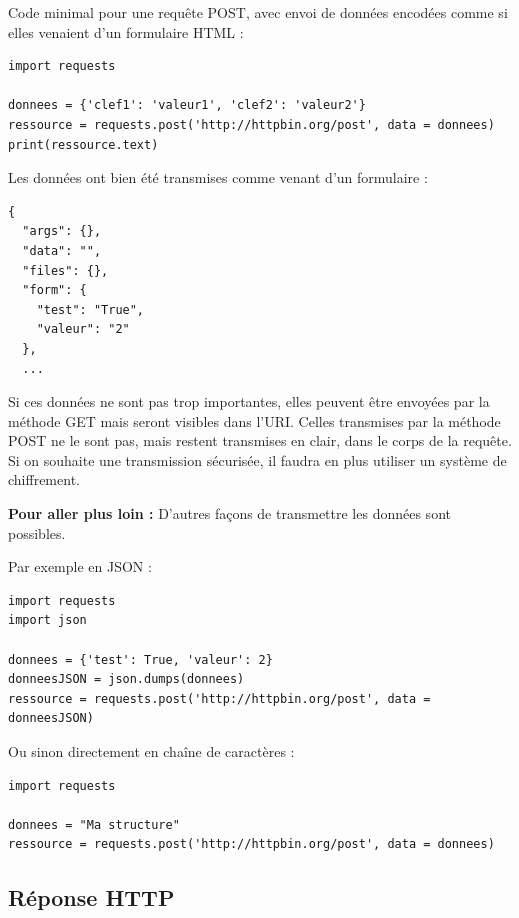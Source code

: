 \medskip

Code minimal pour une requête POST, avec envoi de données encodées comme si elles venaient d'un formulaire HTML :

\vspace{-2ex}
\begin{verbatim}
import requests

donnees = {'clef1': 'valeur1', 'clef2': 'valeur2'}
ressource = requests.post('http://httpbin.org/post', data = donnees)
print(ressource.text)
\end{verbatim}

Les données ont bien été transmises comme venant d'un formulaire :


\vspace{-2ex}
\begin{verbatim}
{
  "args": {}, 
  "data": "", 
  "files": {}, 
  "form": {
    "test": "True", 
    "valeur": "2"
  }, 
  ...
\end{verbatim}

Si ces données ne sont pas trop importantes, elles peuvent être envoyées par la méthode GET mais seront visibles dans l'URI. Celles transmises par la méthode POST ne le sont pas, mais restent transmises en clair, dans le corps de la requête. Si on souhaite une transmission sécurisée, il faudra en plus utiliser un système de chiffrement.

\medskip

{\bfseries Pour aller plus loin :} D'autres façons de transmettre les données sont possibles.

Par exemple en JSON :

\vspace{-2ex}
\begin{verbatim}
import requests
import json

donnees = {'test': True, 'valeur': 2}
donneesJSON = json.dumps(donnees)
ressource = requests.post('http://httpbin.org/post', data = donneesJSON)
\end{verbatim}

Ou sinon directement en chaîne de caractères :

\vspace{-2ex}
\begin{verbatim}
import requests

donnees = "Ma structure"
ressource = requests.post('http://httpbin.org/post', data = donnees)
\end{verbatim}



\subsection{Réponse HTTP}

